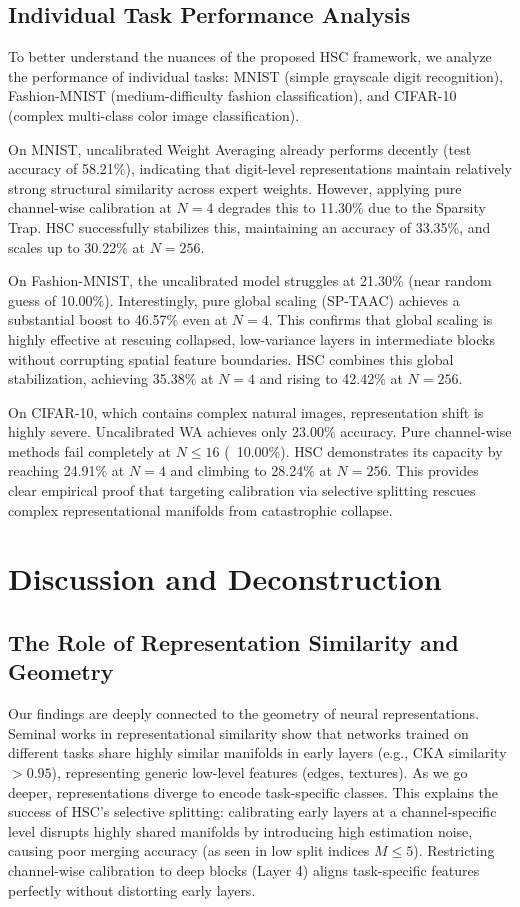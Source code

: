 \documentclass{article}
\begin{document}
\subsection{Individual Task Performance Analysis}
To better understand the nuances of the proposed HSC framework, we analyze the performance of individual tasks: MNIST (simple grayscale digit recognition), Fashion-MNIST (medium-difficulty fashion classification), and CIFAR-10 (complex multi-class color image classification).

On MNIST, uncalibrated Weight Averaging already performs decently (test accuracy of 58.21\%), indicating that digit-level representations maintain relatively strong structural similarity across expert weights. However, applying pure channel-wise calibration at $N=4$ degrades this to 11.30\% due to the Sparsity Trap. HSC successfully stabilizes this, maintaining an accuracy of 33.35\%, and scales up to 30.22\% at $N=256$.

On Fashion-MNIST, the uncalibrated model struggles at 21.30\% (near random guess of 10.00\%). Interestingly, pure global scaling (SP-TAAC) achieves a substantial boost to 46.57\% even at $N=4$. This confirms that global scaling is highly effective at rescuing collapsed, low-variance layers in intermediate blocks without corrupting spatial feature boundaries. HSC combines this global stabilization, achieving 35.38\% at $N=4$ and rising to 42.42\% at $N=256$.

On CIFAR-10, which contains complex natural images, representation shift is highly severe. Uncalibrated WA achieves only 23.00\% accuracy. Pure channel-wise methods fail completely at $N \le 16$ (~10.00\%). HSC demonstrates its capacity by reaching 24.91\% at $N=4$ and climbing to 28.24\% at $N=256$. This provides clear empirical proof that targeting calibration via selective splitting rescues complex representational manifolds from catastrophic collapse.

\section{Discussion and Deconstruction}
\label{sec:discussion}

\subsection{The Role of Representation Similarity and Geometry}
Our findings are deeply connected to the geometry of neural representations. Seminal works in representational similarity \cite{kornblith2019similarity, raghu2017svcca, morcos2018insights} show that networks trained on different tasks share highly similar manifolds in early layers (e.g., CKA similarity $> 0.95$), representing generic low-level features (edges, textures). As we go deeper, representations diverge to encode task-specific classes. This explains the success of HSC's selective splitting: calibrating early layers at a channel-specific level disrupts highly shared manifolds by introducing high estimation noise, causing poor merging accuracy (as seen in low split indices $M \le 5$). Restricting channel-wise calibration to deep blocks (Layer 4) aligns task-specific features perfectly without distorting early layers.
\end{document}
